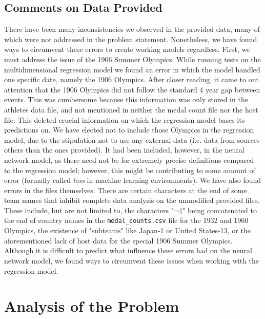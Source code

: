\documentclass{mcmthesis}
\begin{document}
\subsection{Comments on Data Provided}
There have been many inconsistencies we observed in the provided data, many of which were not addressed in the problem statement. Nonetheless, we have found ways to circumvent these errors to create working models regardless. First, we must address the issue of the 1906 Summer Olympics. While running tests on the multidimensional regression model we found an error in which the model handled one specific date, namely the 1906 Olympics. After closer reading, it came to out attention that the 1906 Olympics did not follow the standard 4 year gap between events. This was cumbersome because this information was only stored in the athletes data file, and not mentioned in neither the medal count file nor the host file. This deleted crucial information on which the regression model bases its predictions on. We have elected not to include those Olympics in the regression model, due to the stipulation not to use any external data (i.e. data from sources others than the ones provided). It had been included, however, in the neural network model, as there need not be for extremely precise definitions compared to the regression model; however, this might be contributing to some amount of error (formally called \textit{loss} in machine learning environments).
We have also found errors in the files themselves. There are certain characters at the end of some team names that inhibit complete data analysis on the unmodified provided files. These include, but are not limited to, the characters "¬†" being concatenated to the end of country names in the \texttt{medal\_counts.csv} file for the 1932 and 1960 Olympics, the existence of "subteams" like Japan-1 or United States-13, or the aforementioned lack of host data for the special 1906 Summer Olympics. Although it is difficult to predict what influence these errors had on the neural network model, we found ways to circumvent these issues when working with the regression model. 

\section{Analysis of the Problem}
\end{document}
